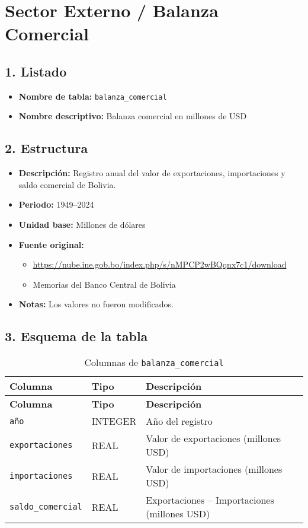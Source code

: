 \documentclass[12pt,a4paper]{article}
\begin{document}
\newpage
\section{Sector Externo / Balanza Comercial}

\subsection*{1. Listado}
\begin{itemize}
  \item \textbf{Nombre de tabla:} \texttt{balanza\_comercial}
  \item \textbf{Nombre descriptivo:} Balanza comercial en millones de USD
\end{itemize}

\subsection*{2. Estructura}
\begin{itemize}
  \item \textbf{Descripción:} Registro anual del valor de exportaciones, importaciones y saldo comercial de Bolivia.
  \item \textbf{Periodo:} 1949--2024
  \item \textbf{Unidad base:} Millones de dólares
  \item \textbf{Fuente original:}
    \begin{itemize}
      \item \url{https://nube.ine.gob.bo/index.php/s/nMPCP2wBQqnx7c1/download}
      \item Memorias del Banco Central de Bolivia
    \end{itemize}
  \item \textbf{Notas:} Los valores no fueron modificados.
\end{itemize}

\subsection*{3. Esquema de la tabla}
\begin{longtable}{@{}lll@{}}
\caption{Columnas de \texttt{balanza\_comercial}}\\
\toprule
\textbf{Columna} & \textbf{Tipo} & \textbf{Descripción} \\
\midrule
\endfirsthead
\toprule
\textbf{Columna} & \textbf{Tipo} & \textbf{Descripción} \\
\midrule
\endhead
\bottomrule
\endfoot
\texttt{año}              & INTEGER & Año del registro \\
\texttt{exportaciones}    & REAL    & Valor de exportaciones (millones USD) \\
\texttt{importaciones}    & REAL    & Valor de importaciones (millones USD) \\
\texttt{saldo\_comercial} & REAL    & Exportaciones -- Importaciones (millones USD) \\
\end{longtable}
\end{document}
